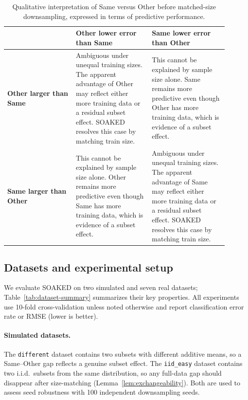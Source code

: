 \documentclass{article}
\begin{document}
\begin{table}[t]
\centering
\small
 \caption{Qualitative interpretation of Same versus Other before matched-size downsampling, expressed in terms of predictive performance.}
\label{tab:scenario-interpretation}
\begin{tabular}{p{0.28\linewidth}p{0.31\linewidth}p{0.31\linewidth}}
\toprule
 & \textbf{Other lower error than Same} & \textbf{Same lower error than Other} \\
\midrule
\textbf{Other larger than Same} &
Ambiguous under unequal training sizes. The apparent advantage of Other may reflect either more training data or a residual subset effect. SOAKED resolves this case by matching train size. &
This cannot be explained by sample size alone. Same remains more predictive even though Other has more training data, which is evidence of a subset effect. \\
\addlinespace
\textbf{Same larger than Other} &
This cannot be explained by sample size alone. Other remains more predictive even though Same has more training data, which is evidence of a subset effect. &
Ambiguous under unequal training sizes. The apparent advantage of Same may reflect either more training data or a residual subset effect. SOAKED resolves this case by matching train size. \\
\bottomrule
\end{tabular}
\end{table}
\subsection{Datasets and experimental setup}
\label{sec:datasets}

We evaluate SOAKED on two simulated and seven real datasets; Table~\ref{tab:dataset-summary} summarizes their key properties.
All experiments use 10-fold cross-validation unless noted otherwise and report classification error rate or RMSE (lower is better).

\paragraph{Simulated datasets.}
The \texttt{different} dataset contains two subsets with different additive means, so a Same--Other gap reflects a genuine subset effect.
The \texttt{iid\_easy} dataset contains two i.i.d.\ subsets from the same distribution, so any full-data gap should disappear after size-matching (Lemma~\ref{lem:exchangeability}).
Both are used to assess seed robustness with 100 independent downsampling seeds.
\end{document}
